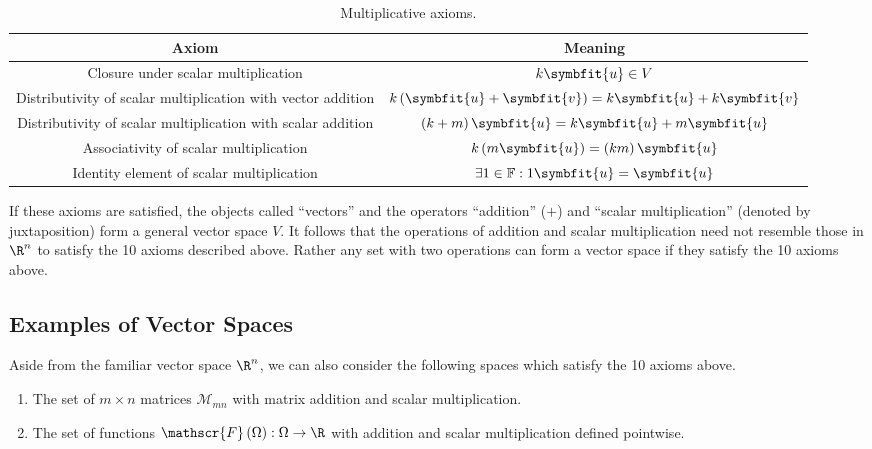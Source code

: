 \documentclass{article}
\begin{document}
\begin{table}[H]
    \centering
    \begin{tabular}{c c}
        \toprule
        \textbf{Axiom}                                               & \textbf{Meaning}                                                             \\
        \midrule
        Closure under scalar multiplication                          & \(k \symbfit{u} \in V\)                                                      \\
        Distributivity of scalar multiplication with vector addition & \(k \left( \symbfit{u} + \symbfit{v} \right) = k\symbfit{u} + k\symbfit{v}\) \\
        Distributivity of scalar multiplication with scalar addition & \(\left( k + m \right) \symbfit{u} = k\symbfit{u} + m\symbfit{u}\)           \\
        Associativity of scalar multiplication                       & \(k \left( m\symbfit{u} \right) = \left( k m \right) \symbfit{u}\)           \\
        Identity element of scalar multiplication                    & \(\exists 1 \in \mathbb{F} : 1 \symbfit{u} = \symbfit{u}\)                                              \\
        \bottomrule
    \end{tabular}
    \caption{Multiplicative axioms.} %
\end{table}
If these axioms are satisfied, the objects called ``vectors'' and the operators ``addition'' (\(+\)) and ``scalar multiplication'' (denoted by juxtaposition) form a general vector space \(V\).
It follows that the operations of addition and scalar multiplication need not resemble those in \(\R^n\) to satisfy the 10 axioms described above.
Rather any set with two operations can form a vector space if they satisfy the 10 axioms above.
\subsection{Examples of Vector Spaces}
Aside from the familiar vector space \(\R^n\), we can also consider the following spaces which satisfy the 10 axioms above.
\begin{enumerate}
    \item The set of \(m \times n\) matrices \(\mathscr{M}_{mn}\) with matrix addition and scalar multiplication.
    \item The set of functions \(\mathscr{F}\left( \Omega \right) : \Omega \to \R\) with addition and scalar multiplication defined pointwise.
\end{enumerate}
\end{document}
